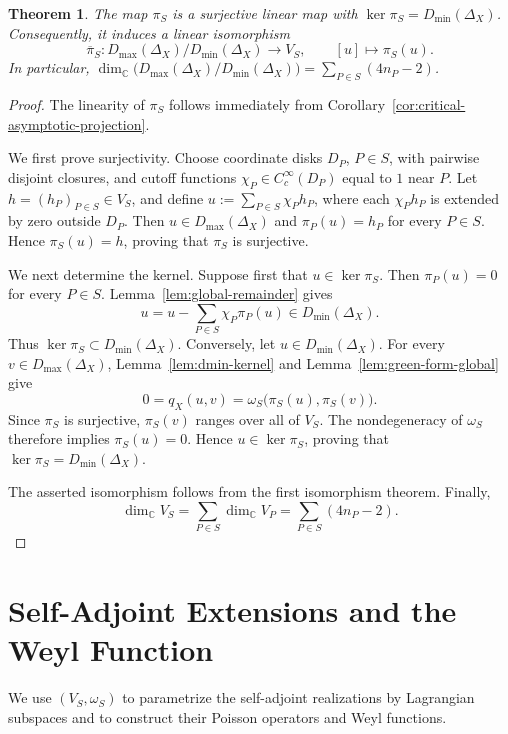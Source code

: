 \documentclass[12pt]{amsart}
\theoremstyle{plain}
\newtheorem{thm}{Theorem}[section]
\theoremstyle{definition}
\theoremstyle{remark}
\numberwithin{equation}{section} \numberwithin{figure}{section}
\begin{document}
\begin{thm}\label{thm:quotient-general}
The map \(\pi_S\) is a surjective linear map with
\(\ker\pi_S=D_{\min}(\Delta_X)\). Consequently, it induces a linear
isomorphism
\[
\overline{\pi}_S:
D_{\max}(\Delta_X)/D_{\min}(\Delta_X)
\longrightarrow V_S,
\qquad
[u]\longmapsto\pi_S(u).
\]
In particular,
\(\dim_{\mathbb C}\bigl(D_{\max}(\Delta_X)/
D_{\min}(\Delta_X)\bigr)
=\sum_{P\in S}(4n_P-2)\).
\end{thm}
\begin{proof}
The linearity of \(\pi_S\) follows immediately from
Corollary~\ref{cor:critical-asymptotic-projection}.

We first prove surjectivity. Choose coordinate disks \(D_P\),
\(P\in S\), with pairwise disjoint closures, and cutoff functions
\(\chi_P\in C_c^\infty(D_P)\) equal to \(1\) near \(P\). Let
\(h=(h_P)_{P\in S}\in V_S\), and define
\(u:=\sum_{P\in S}\chi_P h_P\), where each \(\chi_P h_P\) is extended
by zero outside \(D_P\). Then \(u\in D_{\max}(\Delta_X)\) and
\(\pi_P(u)=h_P\) for every \(P\in S\). Hence \(\pi_S(u)=h\), proving
that \(\pi_S\) is surjective.

We next determine the kernel. Suppose first that
\(u\in\ker\pi_S\). Then \(\pi_P(u)=0\) for every \(P\in S\).
Lemma~\ref{lem:global-remainder} gives
\[
u
=
u-\sum_{P\in S}\chi_P\pi_P(u)
\in D_{\min}(\Delta_X).
\]
Thus \(\ker\pi_S\subset D_{\min}(\Delta_X)\).
Conversely, let \(u\in D_{\min}(\Delta_X)\). For every
\(v\in D_{\max}(\Delta_X)\), Lemma~\ref{lem:dmin-kernel} and
Lemma~\ref{lem:green-form-global} give
\[
0
=
q_X(u,v)
=
\omega_S\bigl(\pi_S(u),\pi_S(v)\bigr).
\]
Since \(\pi_S\) is surjective, \(\pi_S(v)\) ranges over all of \(V_S\).
The nondegeneracy of \(\omega_S\) therefore implies
\(\pi_S(u)=0\). Hence
\(u\in\ker\pi_S\), proving that
\(\ker\pi_S=D_{\min}(\Delta_X)\).

The asserted isomorphism follows from the first isomorphism theorem.
Finally,
\[
\dim_{\mathbb C}V_S
=
\sum_{P\in S}\dim_{\mathbb C}V_P
=
\sum_{P\in S}(4n_P-2).
\]
\end{proof}



\section{Self-Adjoint Extensions and the Weyl Function}
We use \((V_S,\omega_S)\) to parametrize the self-adjoint
realizations by Lagrangian subspaces and to construct their Poisson
operators and Weyl functions.
\end{document}
